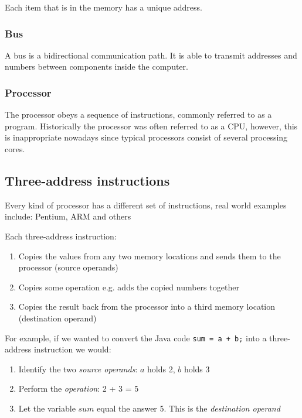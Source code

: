 Each item that is in the memory has a unique address.


\subsubsection{Bus}

A bus is a bidirectional communication path. It is able to transmit addresses
and numbers between components inside the computer.

\subsubsection{Processor}

The processor obeys a sequence of instructions, commonly referred to as a
program. Historically the processor was often referred to as a CPU, however,
this is inappropriate nowadays since typical processors consist of several
processing cores.

\subsection{Three-address instructions}

Every kind of processor has a different set of instructions, real world examples
include: Pentium, ARM and others

Each three-address instruction:
\begin{enumerate}
	\item Copies the values from any two memory locations and sends them to the
	processor (source operands)
	\item Copies some operation e.g. adds the copied numbers together
	\item Copies the result back from the processor into a third memory location
	(destination operand)
\end{enumerate}

For example, if we wanted to convert the Java code {\tt sum = a + b;} into a
three-address instruction we would:

\begin{enumerate}
	\item Identify the two {\it source operands}: $a$ holds 2, $b$ holds 3
	\item Perform the {\it operation}: 2 + 3 = 5
	\item Let the variable $sum$ equal the answer 5. This is the {\it 
	destination operand}
\end{enumerate}

